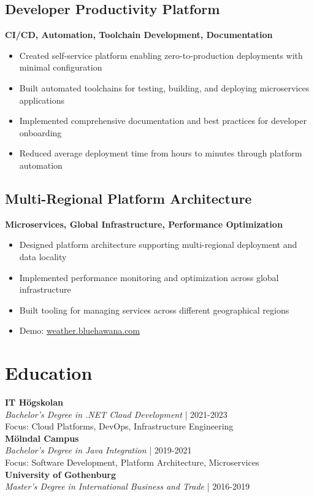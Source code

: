 \documentclass[11pt,a4paper]{article}
\begin{document}
\subsection{Developer Productivity Platform}
\textbf{CI/CD, Automation, Toolchain Development, Documentation}
\begin{itemize}[noitemsep]
  \item Created self-service platform enabling zero-to-production deployments with minimal configuration
  \item Built automated toolchains for testing, building, and deploying microservices applications
  \item Implemented comprehensive documentation and best practices for developer onboarding
  \item Reduced average deployment time from hours to minutes through platform automation
\end{itemize}

\subsection{Multi-Regional Platform Architecture}
\textbf{Microservices, Global Infrastructure, Performance Optimization}
\begin{itemize}[noitemsep]
  \item Designed platform architecture supporting multi-regional deployment and data locality
  \item Implemented performance monitoring and optimization across global infrastructure
  \item Built tooling for managing services across different geographical regions
  \item Demo: \href{https://weather.bluehawana.com}{weather.bluehawana.com}
\end{itemize}

\vspace{6pt}
\section*{Education}
\textbf{IT Högskolan}\\
\textit{Bachelor's Degree in .NET Cloud Development} | 2021-2023\\
Focus: Cloud Platforms, DevOps, Infrastructure Engineering\\
\textbf{Mölndal Campus}\\
\textit{Bachelor's Degree in Java Integration} | 2019-2021\\
Focus: Software Development, Platform Architecture, Microservices\\
\textbf{University of Gothenburg}\\
\textit{Master's Degree in International Business and Trade} | 2016-2019\\
\end{document}

